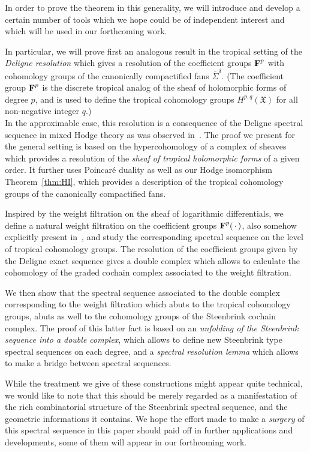 \documentclass[11pt]{amsart}
\theoremstyle{definition}
\numberwithin{equation}{section}
\renewcommand{\~}{\widetilde}
\newcommand{\ccdot}{\,\cdot\,}
\newcommand{\SF}{\textrm{\bf F}} %
\newcommand{\comp}[1]{\overline{#1}} %
\newcommand{\X}{\mathfrak X}
\begin{document}
\medskip

In order to prove the theorem in this generality, we will introduce and develop a certain number of tools which we hope could be of independent interest and which will be used in our forthcoming work.

\smallskip
In particular, we will prove first an analogous result in the tropical setting of the \emph{Deligne resolution} which gives a resolution of the coefficient groups $\SF^p$ with cohomology groups of the canonically compactified fans $\comp \Sigma^\delta$. (The coefficient group $\SF^p$ is the discrete tropical analog of the sheaf of holomorphic forms of degree $p$, and is used to define the tropical cohomology groups $H^{p,q}(\X)$ for all non-negative integer $q$.) \\
In the approximable case, this resolution is a consequence of the Deligne spectral sequence in mixed Hodge theory as was observed in~\cite{IKMZ}. The proof we present for the general setting is based on the hypercohomology of a complex of sheaves which provides a resolution of the \emph{sheaf of tropical holomorphic forms} of a given order. It further uses Poincar\'e duality as well as our Hodge isomorphism Theorem~\ref{thm:HI}, which provides a description of the tropical cohomology groups of the canonically compactified fans.

\smallskip
Inspired by the weight filtration on the sheaf of logarithmic differentials, we define a natural weight filtration on the coefficient groups $\SF^p(\ccdot)$, also somehow explicitly present in~\cite{IKMZ},  and study the corresponding spectral sequence on the level of tropical cohomology groups. The resolution of the coefficient groups given by the Deligne exact sequence gives a double complex which allows to calculate the cohomology of the graded cochain complex associated to the weight filtration.

\smallskip
We then show that the spectral sequence associated to the double complex corresponding to the weight filtration which abuts to the tropical cohomology groups, abuts as well to the cohomology groups of the Steenbrink cochain complex.  The proof of this latter fact is based on an \emph{unfolding of the Steenbrink sequence into a double complex}, which allows to define new Steenbrink type spectral sequences on each degree, and a \emph{spectral resolution lemma} which allows to make a bridge between spectral sequences.

\medskip

While the treatment we give of these constructions might appear quite technical, we would like to note that this should be merely regarded as a manifestation of the rich combinatorial structure of the Steenbrink spectral sequence, and the geometric informations it contains. We hope the effort made to make a \emph{surgery} of this spectral sequence in this paper should paid off in further applications and developments, some of them will appear in our forthcoming work.
\end{document}
